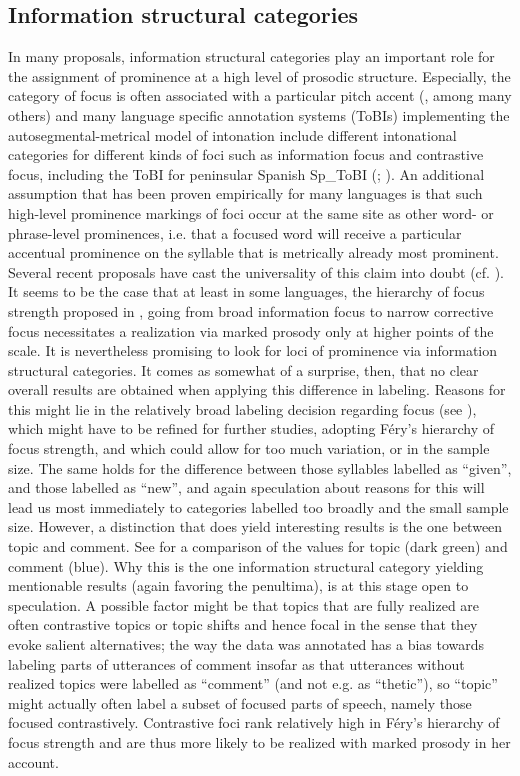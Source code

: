 \documentclass[output=paper]{LSP/langsci}
\begin{document}
\subsection{Information structural categories}
In many proposals, information structural categories play an important role for the assignment of prominence at a high level of prosodic structure. Especially, the category of focus is often associated with a particular pitch accent (\citealt{Buering2012}, among many others) and many language specific annotation systems (ToBIs) implementing the autosegmental-metrical model of intonation \citep{Pierrehumbert1980} include different intonational categories for different kinds of foci such as information focus and contrastive focus, including the ToBI for peninsular Spanish Sp\_ToBI (\citealt{Beckman.2002}; \citealt{EstebasVilaplanaPrieto.2008}). An additional assumption that has been proven empirically for many languages is that such high-level prominence markings of foci occur at the same site as other word- or phrase-level prominences, i.e. that a focused word will receive a particular accentual prominence on the syllable that is metrically already most prominent. Several recent proposals have cast the universality of this claim into doubt (cf. \citealt{Kuegler2012,Fery2013}). It seems to be the case that at least in some languages, the hierarchy of focus strength proposed in \citet[688--690]{Fery2013}, going from broad information focus to narrow corrective focus necessitates a realization via marked prosody only at higher points of the scale. It is nevertheless promising to look for loci of prominence via information structural categories. It comes as somewhat of a surprise, then, that no clear overall results are obtained when applying this difference in labeling. Reasons for this might lie in the relatively broad labeling decision regarding focus (see ), which might have to be refined for further studies, adopting Féry’s hierarchy of focus strength, and which could allow for too much variation, or in the sample size. The same holds for the difference between those syllables labelled as “given”, and those labelled as “new”, and again speculation about reasons for this will lead us most immediately to categories labelled too broadly and the small sample size. However, a distinction that does yield interesting results is the one between topic and comment. See  for a comparison of the values for topic (dark green) and comment (blue). Why this is the one information structural category yielding mentionable results (again favoring the penultima), is at this stage open to speculation. A possible factor might be that topics that are fully realized are often contrastive topics or topic shifts and hence focal in the sense that they evoke salient alternatives; the way the data was annotated has a bias towards labeling parts of utterances of comment insofar as that utterances without realized topics were labelled as “comment”  (and not e.g. as “thetic”), so “topic” might actually often label a subset of focused parts of speech, namely those  focused contrastively. Contrastive foci rank relatively high in Féry’s hierarchy of focus strength and are thus more likely to be realized with marked prosody in her account.   
\end{document}
